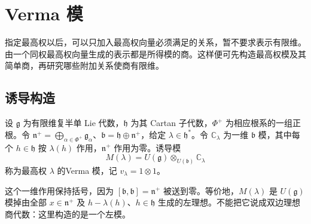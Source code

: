 %
%

\section{Verma 模}
\label{b5:sec:1803}

指定最高权以后，可以只加入最高权向量必须满足的关系，暂不要求表示有限维。由一个同权最高权向量生成的表示都是所得模的商。这样便可先构造最高权模及其简单商，再研究哪些附加关系使商有限维。

\subsection{诱导构造}
\label{b5:subsec:1803:01}

\begin{definition}\label{b5:def:verma-module}
	设 \(\mathfrak g\) 为有限维复半单 Lie 代数，\(\mathfrak h\) 为其 Cartan 子代数，\(\Phi^+\) 为相应根系的一组正根。令 \(\mathfrak n^+=\bigoplus_{\alpha\in\Phi^+}\mathfrak g_\alpha\)、\(\mathfrak b=\mathfrak h\oplus\mathfrak n^+\)，给定 \(\lambda\in\mathfrak h^*\)。令 \(\mathbb C_\lambda\) 为一维 \(\mathfrak b\) 模，其中每个 \(h\in\mathfrak h\) 按 \(\lambda(h)\) 作用，\(\mathfrak n^+\) 作用为零。诱导模
	\[
		M(\lambda)=U(\mathfrak g)\otimes_{U(\mathfrak b)}\mathbb C_\lambda
	\]
	称为最高权 \(\lambda\) 的Verma 模，记 \(v_\lambda=1\otimes1\)。
\end{definition}

这个一维作用保持括号，因为 \([\mathfrak b,\mathfrak b]=\mathfrak n^+\) 被送到零。等价地，\(M(\lambda)\) 是 \(U(\mathfrak g)\) 模掉由全部 \(x\in\mathfrak n^+\) 及 \(h-\lambda(h)\)、\(h\in\mathfrak h\) 生成的左理想。不能把它说成双边理想商代数：这里构造的是一个左模。

